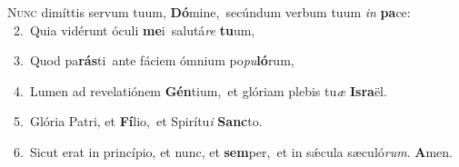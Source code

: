 \lettrine{\initial\textcolor{\initialcolor}{N}}{unc} dimíttis servum tuum, \textbf{Dó}\-mine,~\star secúndum verbum tuum \textit{in} \textbf{pa}\-ce:\\
{\numbfont\textcolor{\numbcolor}{~2.}}~Quia vidérunt óculi \textbf{me}\-i~\star salutá\textit{re} \textbf{tu}\-um,\par
{\numbfont\textcolor{\numbcolor}{~3.}}~Quod pa\-\textbf{rás}\-ti~\star ante fáciem ómnium po\-\textit{pu}\-\textbf{ló}rum,\par
{\numbfont\textcolor{\numbcolor}{~4.}}~Lumen ad revelatiónem \textbf{Gén}\-tium,~\star et glóriam plebis tu\textit{æ} \textbf{Is}\-\textbf{ra}ël.\par
{\numbfont\textcolor{\numbcolor}{~5.}}~Glória Patri, et \textbf{Fí}\-lio,~\star et Spirítu\textit{i} \textbf{Sanc}\-to.\par
{\numbfont\textcolor{\numbcolor}{~6.}}~Sicut erat in princípio, et nunc, et \textbf{sem}\-per,~\star et in sǽcula sæculó\-\textit{rum}\-. \textbf{A}\-men.\par
